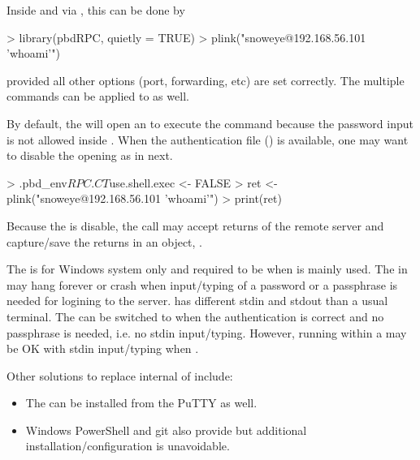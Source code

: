 Inside  and via , this can be done by
\begin{Code}[title=Basic \code{plink()} in \pkg{pbdRPC} and \proglang{R}]
> library(pbdRPC, quietly = TRUE)
> plink("snoweye@192.168.56.101 'whoami'")
\end{Code}
provided all other options (port, forwarding, etc) are set correctly.
The multiple commands can be applied to  as well.

By default,
the  will open an  to execute the
command  because the password input is not allowed inside
.
When the authentication file () is available,
one may want to disable the opening  as in next.
\begin{Code}[title=Advance \code{plink()} in \pkg{pbdRPC} and \proglang{R}]
> .pbd_env$RPC.CT$use.shell.exec <- FALSE
> ret <- plink("snoweye@192.168.56.101 'whoami'")
> print(ret)
\end{Code}
Because the  is disable, the  call
may accept returns of the remote server and capture/save the returns
in an  object, .

The  is for Windows system only and
required to be  when  is mainly used. The
 in  may hang forever or crash when input/typing of a
password or a passphrase is needed for logining to the server.
 has different stdin and stdout than a usual terminal.
The  can be switched to  when
the authentication is correct and no passphrase is needed, i.e.
{\color{red} no stdin input/typing. }
However,  running within a  may be OK with stdin
input/typing when .

Other solutions to replace internal  of 
include:
\begin{itemize}
\item
The  can be installed from the PuTTY as well.
\item
Windows PowerShell and git also provide  but
additional installation/configuration is unavoidable.
\end{itemize}

